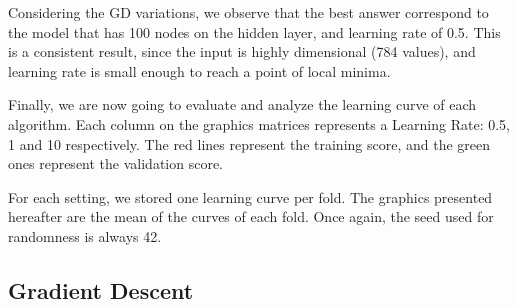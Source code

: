 \documentclass[11pt]{article}
\begin{document}
Considering the GD variations, we observe that the best answer
correspond to the model that has 100 nodes on the hidden layer, and
learning rate of 0.5. This is a consistent result, since the input is
highly dimensional (784 values), and learning rate is small enough to
reach a point of local minima.

Finally, we are now going to evaluate and analyze the learning curve of
each algorithm. Each column on the graphics matrices represents a
Learning Rate: 0.5, 1 and 10 respectively. The red lines represent the
training score, and the green ones represent the validation score.

For each setting, we stored one learning curve per fold. The graphics
presented hereafter are the mean of the curves of each fold. Once again,
the seed used for randomness is always 42.

    \subsection{Gradient Descent}\label{gradient-descent}
\end{document}
